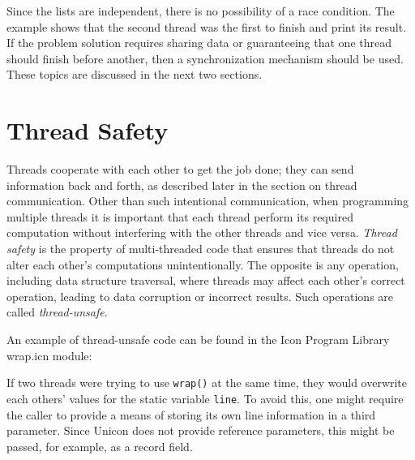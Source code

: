 Since the lists are independent, there is no possibility of a race
condition. The example shows that the second thread was the first to
finish and print its result. If the problem solution requires sharing
data or guaranteeing that one thread should finish before another,
then a synchronization mechanism should be used. These topics are
discussed in the next two sections.


\section{Thread Safety}

Threads cooperate with each other to get the job done; they can send
information back and forth, as described later in the section on
thread communication. Other than such intentional communication, when
programming multiple threads it is important that each thread perform
its required computation without interfering with the other threads and
vice versa.  {\em Thread safety} is the property of multi-threaded
code that ensures that threads do not alter each other's computations
unintentionally.  The opposite is any operation, including data
structure traversal, where threads may affect each other's correct
operation, leading to data corruption or incorrect results. Such
operations are called \emph{thread-unsafe}.

An example of thread-unsafe code can be found in the Icon Program
Library wrap.icn module:


If two threads were trying to use \texttt{wrap()} at the same time,
they would overwrite each others' values for the static variable
\texttt{line}.  To avoid this, one might require the caller to provide
a means of storing its own line information in a third parameter. Since
Unicon does not provide reference parameters, this might be passed,
for example, as a record field.


